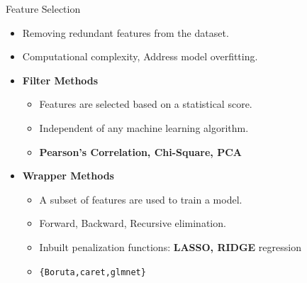 \documentclass[12pt,ignorenonframetext,]{beamer}
\providecommand{\tightlist}{%
  \setlength{\itemsep}{0pt}\setlength{\parskip}{0pt}}
\begin{document}
\begin{frame}{Feature Selection}
\protect\hypertarget{feature-selection}{}

\begin{itemize}
\tightlist
\item
  Removing redundant features from the dataset. \vspace{2mm}
\item
  Computational complexity, Address model overfitting. \vspace{2mm}
\item
  \textbf{Filter Methods}

  \begin{itemize}
      \item Features are selected based on a statistical score.
      \item Independent of any machine learning algorithm.
      \item \textbf{Pearson’s Correlation, Chi-Square, PCA}
  \end{itemize}
   \vspace{2mm}
\item
  \textbf{Wrapper Methods}

  \begin{itemize}
      \item A subset of features are used to train a model.
      \item Forward, Backward, Recursive elimination.
      \item Inbuilt penalization functions: \textbf{LASSO, RIDGE} regression 
      \item \texttt{\{Boruta,caret,glmnet\}}
  \end{itemize}
\end{itemize}

\end{frame}
\end{document}
